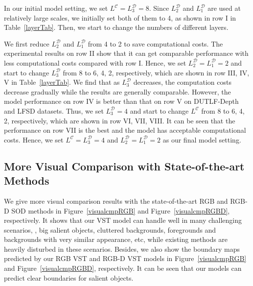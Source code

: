 \documentclass[10pt,twocolumn,letterpaper]{article}
\begin{document}
In our initial model setting, we set $L^{\mathcal{C}}=L_3^{\mathcal{D}}=8$. Since $L_2^{\mathcal{D}}$ and $L_1^{\mathcal{D}}$ are used at relatively large scales, we initially set both of them to 4, as shown in row I in Table~\ref{layerTab}. Then, we start to change the numbers of different layers.

We first reduce $L_2^{\mathcal{D}}$ and $L_1^{\mathcal{D}}$ from 4 to 2 to save computational costs.
The experimental results on row II show that it can get comparable performance with less computational costs compared with row I.
Hence, we set $L_2^{\mathcal{D}}=L_1^{\mathcal{D}}=2$ and start to change $L_3^{\mathcal{D}}$ from 8 to 6, 4, 2, respectively, which are shown in row III, IV, V in Table~\ref{layerTab}.
We find that as $L_3^{\mathcal{D}}$ decreases, the computation costs decrease gradually while the results are generally comparable.
However, the model performance on row IV is better than that on row V on DUTLF-Depth and LFSD datasets.
Thus, we set $L_3^{\mathcal{D}}=4$ and start to change $L^{\mathcal{C}}$ from 8 to 6, 4, 2, respectively, which are shown in row VI, VII, VIII.
It can be seen that the performance on row VII is the best and the model has acceptable computational costs.
Hence, we set $L^{\mathcal{C}}=L_3^{\mathcal{D}}=4$ and $L_2^{\mathcal{D}}=L_1^{\mathcal{D}}=2$ as our final model setting.


\subsection{More Visual Comparison with State-of-the-art Methods}
We give more visual comparison results with the state-of-the-art RGB and RGB-D SOD methods in Figure~\ref{visualcmpRGB} and Figure~\ref{visualcmpRGBD}, respectively. It shows that our VST model can handle well in many challenging scenarios, \ie, big salient objects, cluttered backgrounds, foregrounds and backgrounds with very similar appearance, etc, while existing methods are heavily disturbed in these scenarios.
Besides, we also show the boundary maps predicted by our RGB VST and RGB-D VST models in Figure~\ref{visualcmpRGB} and Figure~\ref{visualcmpRGBD}, respectively. It can be seen that our models can predict clear boundaries for salient objects.
\end{document}
